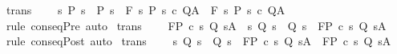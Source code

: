 \begin{isabellebody}
\ {\isacharbrackleft}trans{\isacharbrackright}{\isacharcolon}\isanewline
\ \ \ \ {\isachardoublequoteopen}{\isacharparenleft}{\isasymAnd}s{\isachardot}\ P{\isacharprime}\ s\ {\isasymlongrightarrow}\ P\ s{\isacharparenright}\ {\isasymLongrightarrow}\ {\isasymGamma}{\isacharcomma}{\isasymTheta}{\isasymturnstile}\isactrlbsub {\isacharslash}F\isactrlesub \ {\isacharbraceleft}s{\isachardot}\ P\ s{\isacharbraceright}\ c\ Q{\isacharcomma}A\ {\isasymLongrightarrow}\ {\isasymGamma}{\isacharcomma}{\isasymTheta}{\isasymturnstile}\isactrlbsub {\isacharslash}F\isactrlesub \ {\isacharbraceleft}s{\isachardot}\ P{\isacharprime}\ s{\isacharbraceright}\ c\ Q{\isacharcomma}A{\isachardoublequoteclose}\isanewline
%
\isadelimproof
\ \ %
\endisadelimproof
%
\isatagproof
{}\isamarkupfalse%
\ {\isacharparenleft}rule\ conseqPre{\isacharparenright}\ auto%
\endisatagproof
{\isafoldproof}%
%
\isadelimproof
\isanewline
%
\endisadelimproof
\isanewline
{}\isamarkupfalse%
\ {\isacharbrackleft}trans{\isacharbrackright}{\isacharcolon}\isanewline
\ \ \ \ {\isachardoublequoteopen}{\isasymGamma}{\isacharcomma}{\isasymTheta}{\isasymturnstile}\isactrlbsub {\isacharslash}F\isactrlesub P\ c\ {\isacharbraceleft}s{\isachardot}\ Q\ s{\isacharbraceright}{\isacharcomma}A\ {\isasymLongrightarrow}\ {\isacharparenleft}{\isasymAnd}s{\isachardot}\ Q\ s\ {\isasymlongrightarrow}\ Q{\isacharprime}\ s{\isacharparenright}\ {\isasymLongrightarrow}\ {\isasymGamma}{\isacharcomma}{\isasymTheta}{\isasymturnstile}\isactrlbsub {\isacharslash}F\isactrlesub P\ c\ {\isacharbraceleft}s{\isachardot}\ Q{\isacharprime}\ s{\isacharbraceright}{\isacharcomma}A{\isachardoublequoteclose}\isanewline
%
\isadelimproof
\ \ %
\endisadelimproof
%
\isatagproof
{}\isamarkupfalse%
\ {\isacharparenleft}rule\ conseqPost{\isacharparenright}\ auto%
\endisatagproof
{\isafoldproof}%
%
\isadelimproof
\isanewline
%
\endisadelimproof
\isanewline
{}\isamarkupfalse%
\ {\isacharbrackleft}trans{\isacharbrackright}{\isacharcolon}\isanewline
\ \ \ \ {\isachardoublequoteopen}{\isacharparenleft}{\isasymAnd}s{\isachardot}\ Q\ s\ {\isasymlongrightarrow}\ Q{\isacharprime}\ s{\isacharparenright}\ {\isasymLongrightarrow}\ {\isasymGamma}{\isacharcomma}{\isasymTheta}{\isasymturnstile}\isactrlbsub {\isacharslash}F\isactrlesub P\ c\ {\isacharbraceleft}s{\isachardot}\ Q\ s{\isacharbraceright}{\isacharcomma}A\ {\isasymLongrightarrow}\ {\isasymGamma}{\isacharcomma}{\isasymTheta}{\isasymturnstile}\isactrlbsub {\isacharslash}F\isactrlesub P\ c\ {\isacharbraceleft}s{\isachardot}\ Q{\isacharprime}\ s{\isacharbraceright}{\isacharcomma}A{\isachardoublequoteclose}\isanewline

\end{isabellebody}
